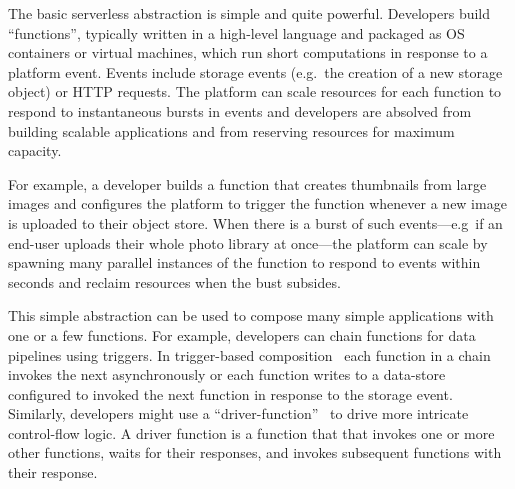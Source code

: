 
The basic serverless abstraction is simple and quite powerful. Developers build
``functions'', typically written in a high-level language and packaged as OS
containers or virtual machines, which run short computations in response to a
platform event. Events include storage events (e.g.\ the creation of a new
storage object) or HTTP requests. The platform can scale resources for each
function to respond to instantaneous bursts in events and developers are
absolved from building scalable applications and from reserving resources for
maximum capacity.

For example, a developer builds a function that creates thumbnails from large
images and configures the platform to trigger the function whenever a new image
is uploaded to their object store. When there is a burst of such events---e.g\
if an end-user uploads their whole photo library at once---the platform can
scale by spawning many parallel instances of the function to respond to events
within seconds and reclaim resources when the bust subsides.

This simple abstraction can be used to compose many simple applications with one
or a few functions. For example, developers can chain functions for data
pipelines using triggers. In trigger-based composition~\cite{netherite} each
function in a chain invokes the next asynchronously or each function writes to a
data-store configured to invoked the next function in response to the storage
event. Similarly, developers might use a ``driver-function''~\cite{beldi} to
drive more intricate control-flow logic. A driver function is a function that
that invokes one or more other functions, waits for their responses, and invokes
subsequent functions with their response.

